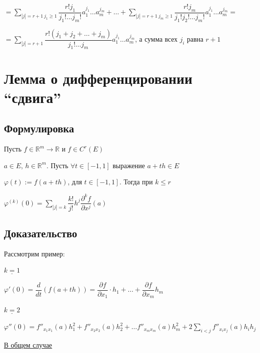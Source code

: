 \documentclass{article}
\begin{document}
            $= \sum\limits_{|j| = r+1 \ j_1 \geq 1} \dfrac{r! j_1}{j_1! \ldots j_m!} a_1^{j_1} \ldots a_m^{j_m} + \ldots + \sum\limits_{|j| = r + 1 \ j_m \geq 1} \dfrac{r! j_m}{j_1! j_2! \ldots j_m!} a_1^{j_1} \ldots a_m^{j_m} =$ 
            
            $= \sum\limits_{|j| = r + 1} \dfrac{r! (j_1 + j_2 + \ldots + j_m)}{j_1! \ldots j_m} a_1^{j_1} \ldots a_m^{j_m}$, а сумма всех $j_i$ равна $r + 1$
            
    \newpage
    
    \section{Лемма о дифференцировании ``сдвига''}
    
        \subsection{Формулировка}
        
            Пусть $f \in \mathbb{R}^m \rightarrow \mathbb{R}$ и $f \in C^r(E)$
            
            $a \in E$, $h \in \mathbb{R}^m$. Пусть $\forall t \in [-1, 1]$ выражение $a + th \in E$
            
            $\varphi(t) := f(a + th)$, для $t \in [-1, 1]$. Тогда при $k \leq r$
            
            $\varphi^{(k)} (0) = \sum\limits_{|j| = k} \dfrac{k!}{j!}h^j \dfrac{\partial^k f}{\partial x^j}(a)$
            
        \subsection{Доказательство}
        
            Рассмотрим пример:
            
            $\underline{k = 1}$
            
            $\varphi'(0) = \dfrac{d}{dt} \left( f(a + th) \right) = \dfrac{\partial f}{\partial x_1} \cdot h_1 + \ldots + \dfrac{\partial f}{\partial x_m} h_m$
            
            $\underline{k = 2}$
            
            $\varphi''(0) = f''_{x_1 x_1} (a) h^2_1 + f''_{x_2 x_2} (a) h^2_2 + \ldots f''_{x_m x_m}(a) h^2_m + 2 \sum\limits_{i < j} f''_{x_i x_j} (a) h_i h_j$
            
            \underline{В общем случае}
            
\end{document}
